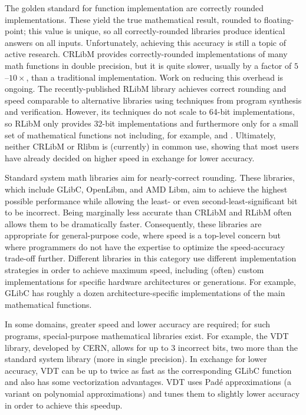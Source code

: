 \documentclass[paper.tex]{subfiles}
\begin{document}
The golden standard for function implementation are correctly rounded
   implementations.
These yield the true mathematical result, rounded to floating-point;
  this value is unique,
  so all correctly-rounded libraries produce identical answers on all inputs.
Unfortunately, achieving this accuracy is still a topic of active research.
CRLibM provides correctly-rounded implementations
  of many math functions in double precision,
  but it is quite slower, usually by a factor of $5$--$10\times$,
  than a traditional implementation.
Work on reducing this overhead is ongoing.
The recently-published RLibM library
  achieves correct rounding and speed comparable to alternative libraries
  using techniques from program synthesis and verification.
However, its techniques do not scale to 64-bit implementations,
  so RLibM only provides 32-bit implementations
  and furthermore only for a small set of mathematical functions
  not including, for example,  and .
Ultimately, neither CRLibM or Rlibm is (currently) in common use, showing that
  most users have already decided on higher speed in exchange for lower
  accuracy.

Standard system math libraries aim for nearly-correct rounding.
These libraries, which include GLibC, OpenLibm, and AMD Libm,
  aim to achieve the highest possible performance
  while allowing the least- or even second-least-significant bit to be incorrect.
Being marginally less accurate than CRLibM and RLibM
  often allows them to be dramatically faster.
Consequently, these libraries are appropriate for general-purpose code,
  where speed is a top-level concern
  but where programmers do not have the expertise
  to optimize the speed-accuracy trade-off further.
Different libraries in this category
  use different implementation strategies
  in order to achieve maximum speed,
  including (often) custom implementations
  for specific hardware architectures or generations.
For example, GLibC has roughly a dozen
  architecture-specific implementations of the main mathematical functions.

In some domains, greater speed and lower accuracy are required;
  for such programs, special-purpose mathematical libraries exist.
For example, the VDT library, developed by CERN,
  allows for up to 3 incorrect bits,
  two more than the standard system library
  (more in single precision).
In exchange for lower accuracy,
  VDT can be up to twice as fast
  as the corresponding GLibC function
  and also has some vectorization advantages.
VDT uses Pad\'e approximations (a variant on polynomial approximations)
  and tunes them to slightly lower accuracy in order to achieve this speedup.
\end{document}
